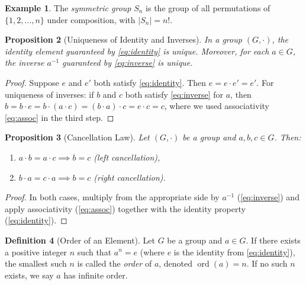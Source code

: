 \documentclass[12pt,a4paper]{article}
\theoremstyle{definition}
\newtheorem{definition}{Definition}[section]
\newtheorem{example}[definition]{Example}
\theoremstyle{plain}
\newtheorem{proposition}[definition]{Proposition}
\theoremstyle{remark}
\newcommand{\ord}{\operatorname{ord}}
\begin{document}
\begin{example}\label{ex:symmetric-group}
The \emph{symmetric group} $S_n$ is the group of all permutations
of $\{1, 2, \dots, n\}$ under composition, with $|S_n| = n!$.
\end{example}

\begin{proposition}[Uniqueness of Identity and Inverses]\label{prop:uniqueness}
In a group $(G, \cdot)$, the identity element guaranteed
by \cref{eq:identity} is unique. Moreover, for each $a \in G$, the inverse
$a^{-1}$ guaranteed by \cref{eq:inverse} is unique.
\end{proposition}

\begin{proof}
Suppose $e$ and $e'$ both satisfy \cref{eq:identity}. Then
$e = e \cdot e' = e'$.
For uniqueness of inverses: if $b$ and $c$ both satisfy \cref{eq:inverse} for $a$, then
$b = b \cdot e = b \cdot (a \cdot c) = (b \cdot a) \cdot c = e \cdot c = c$,
where we used associativity \cref{eq:assoc} in the third step.
\end{proof}

\begin{proposition}[Cancellation Law]\label{prop:cancellation}
Let $(G, \cdot)$ be a group and $a, b, c \in G$. Then:
\begin{enumerate}
    \item $a \cdot b = a \cdot c \implies b = c$ \quad (left cancellation),
    \item $b \cdot a = c \cdot a \implies b = c$ \quad (right cancellation).
\end{enumerate}
\end{proposition}

\begin{proof}
In both cases, multiply from the appropriate side by $a^{-1}$
(\cref{eq:inverse}) and apply associativity (\cref{eq:assoc})
together with the identity property (\cref{eq:identity}).
\end{proof}

\begin{definition}[Order of an Element]\label{def:order}
Let $G$ be a group and $a \in G$. If there exists a positive
integer $n$ such that $a^n = e$ (where $e$ is the identity from \cref{eq:identity}),
the smallest such $n$ is called the \emph{order} of $a$, denoted $\ord(a) = n$.
If no such $n$ exists, we say $a$ has infinite order.
\end{definition}


\end{document}
